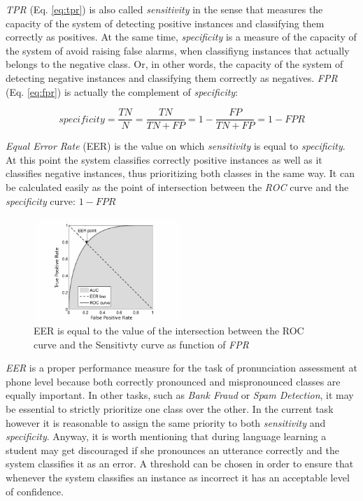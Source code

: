 \textit{TPR} (Eq. \ref{eq:tpr}) is also called \textit{sensitivity} in the sense that measures
the capacity of the system of detecting positive instances and classifying them
correctly as positives.
At the same time, \textit{specificity} is a measure of the capacity of the system of
avoid raising false alarms, when classifiyng instances that actually belongs to the
negative class. Or, in other words, the capacity of the system of detecting negative
instances and classifying them correctly as negatives. \textit{FPR} (Eq. \ref{eq:fpr})
is actually the complement of \textit{specificity}:

\begin{equation}
specificity = \frac{TN}{N} = \frac{TN}{TN+FP} = 1 - \frac{FP}{TN+FP} = 1 - FPR
\end{equation}

\textit{Equal Error Rate} (EER) is the value on which \textit{sensitivity} is equal to
\textit{specificity}. At this point the system classifies correctly positive instances
as well as it classifies negative instances, thus prioritizing both classes in the same
way. It can be calculated easily as the point of intersection between the \textit{ROC}
curve and the \textit{specificity} curve: $1-FPR$

\begin{figure}[H]
  \centering
  \includegraphics[width=0.5\textwidth]{files/figures/method/eer}
  \caption{EER is equal to the value of the intersection between the ROC curve and
  the Sensitivty curve as function of \textit{FPR}}
  \label{fig:eer}
\end{figure}

\textit{EER} is a proper performance measure for the task of pronunciation assessment
at phone level because both correctly pronounced and mispronounced
classes are equally important. In other tasks, such as \textit{Bank Fraud} or
\textit{Spam Detection}, it may be essential to strictly prioritize one class over the
other. In the current task however it is reasonable to assign the same priority
to both \textit{sensitivity} and \textit{specificity}.
Anyway, it is worth mentioning that during language learning a student may get
discouraged if she pronounces an utterance correctly and the system classifies it as
an error. A threshold can be chosen in order to ensure that whenever the system
classifies an instance as incorrect it has an acceptable level of confidence.

